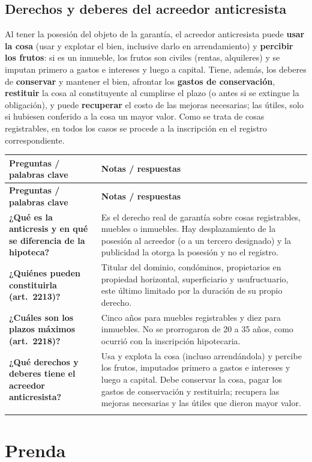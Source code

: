 \documentclass[12pt,oneside]{book}
\makeatletter
\renewcommand{\arraystretch}{1.25}
\newcommand{\cq}[2]{\textbf{#1} & #2 \\[0.45em]}
\newcommand{\cornell}[3]{%
\par\bigskip\noindent{\large\bfseries Cuadro Cornell: #1}\par\nopagebreak\smallskip
\begingroup
\small
\renewcommand{\arraystretch}{1.15}
\begin{longtable}{@{}>{\raggedright\arraybackslash}p{0.26\textwidth}>{\raggedright\arraybackslash}p{0.66\textwidth}@{}}
\toprule
\textbf{Preguntas / palabras clave} & \textbf{Notas / respuestas} \\
\midrule
\endfirsthead
\toprule
\textbf{Preguntas / palabras clave} & \textbf{Notas / respuestas} \\
\midrule
\endhead
#2
\midrule
\multicolumn{2}{@{}p{\dimexpr0.92\textwidth+2\tabcolsep\relax}@{}}{\vspace{0.2em}\textbf{Resumen.} #3\vspace{0.2em}} \\
\bottomrule
\end{longtable}
\endgroup
}
\makeatother
\begin{document}
\subsection{Derechos y deberes del acreedor anticresista}

Al tener la posesión del objeto de la garantía, el acreedor anticresista puede \textbf{usar la cosa} (usar y explotar el bien, inclusive darlo en arrendamiento) y \textbf{percibir los frutos}: si es un inmueble, los frutos son civiles (rentas, alquileres) y se imputan primero a gastos e intereses y luego a capital. Tiene, además, los deberes de \textbf{conservar} y mantener el bien, afrontar los \textbf{gastos de conservación}, \textbf{restituir} la cosa al constituyente al cumplirse el plazo (o antes si se extingue la obligación), y puede \textbf{recuperar} el costo de las mejoras necesarias; las útiles, solo si hubiesen conferido a la cosa un mayor valor. Como se trata de cosas registrables, en todos los casos se procede a la inscripción en el registro correspondiente.

\cornell{anticresis}{
\cq{¿Qué es la anticresis y en qué se diferencia de la hipoteca?}{Es el derecho real de garantía sobre cosas registrables, muebles o inmuebles. Hay desplazamiento de la posesión al acreedor (o a un tercero designado) y la publicidad la otorga la posesión y no el registro.}
\cq{¿Quiénes pueden constituirla (art.~2213)?}{Titular del dominio, condóminos, propietarios en propiedad horizontal, superficiario y usufructuario, este último limitado por la duración de su propio derecho.}
\cq{¿Cuáles son los plazos máximos (art.~2218)?}{Cinco años para muebles registrables y diez para inmuebles. No se prorrogaron de 20 a 35 años, como ocurrió con la inscripción hipotecaria.}
\cq{¿Qué derechos y deberes tiene el acreedor anticresista?}{Usa y explota la cosa (incluso arrendándola) y percibe los frutos, imputados primero a gastos e intereses y luego a capital. Debe conservar la cosa, pagar los gastos de conservación y restituirla; recupera las mejoras necesarias y las útiles que dieron mayor valor.}
}{La anticresis recae sobre cosas registrables e implica el desplazamiento posesorio al acreedor, quien puede usar la cosa y percibir sus frutos, con plazos máximos de cinco y diez años según el bien. El acreedor debe conservar la cosa y restituirla.}

\section{Prenda}
\end{document}
